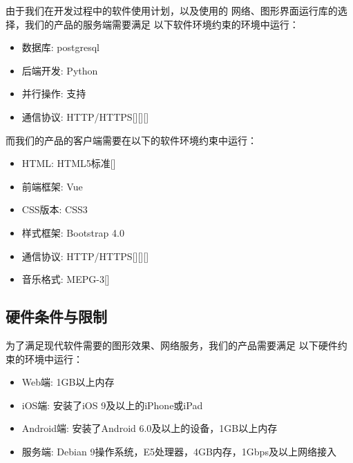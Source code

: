     由于我们在开发过程中的软件使用计划，以及使用的
    网络、图形界面运行库的选择，我们的产品的服务端需要满足
    以下软件环境约束的环境中运行：
    \begin{itemize}
        \item 数据库: postgresql
        \item 后端开发: Python
        \item 并行操作: 支持
        \item 通信协议: HTTP/HTTPS[\cite{berners1996hypertext}][\cite{fielding1999hypertext}][\cite{rescorla2000http}]
    \end{itemize}

    而我们的产品的客户端需要在以下的软件环境约束中运行：
    \begin{itemize}
    \item HTML: HTML5标准[\cite{hickson2011html5}]
    \item 前端框架: Vue
    \item CSS版本: CSS3
    \item 样式框架: Bootstrap 4.0
    \item 通信协议: HTTP/HTTPS[\cite{berners1996hypertext}][\cite{fielding1999hypertext}][\cite{rescorla2000http}]
    \item 音乐格式: MEPG-3[\cite{le1991mpeg}]
\end{itemize}

\subsection{硬件条件与限制} %

        为了满足现代软件需要的图形效果、网络服务，我们的产品需要满足
        以下硬件约束的环境中运行：
        \begin{itemize}
            \item Web端: 1GB以上内存
            \item iOS端: 安装了iOS 9及以上的iPhone或iPad
            \item Android端: 安装了Android 6.0及以上的设备，1GB以上内存
            \item 服务端: Debian 9操作系统，E5处理器，4GB内存，1Gbps及以上网络接入
        \end{itemize}

